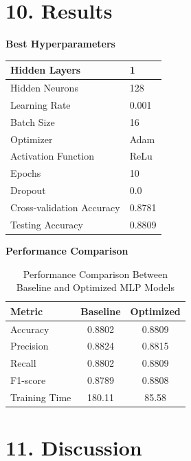 \documentclass[11pt]{article}
\begin{document}
\section*{10. Results}

\textbf{Best Hyperparameters}

\begin{tabular}{|p{6cm}|p{6cm}|}
\hline
Hidden Layers & 1\\\hline 
Hidden Neurons & 128\\\hline
Learning Rate & 0.001\\\hline
Batch Size & 16\\\hline
Optimizer & Adam\\\hline
Activation Function & ReLu\\\hline
Epochs & 10\\\hline
Dropout & 0.0\\\hline
Cross-validation Accuracy & 0.8781\\\hline
Testing Accuracy & 0.8809\\\hline
\end{tabular}

\vspace{3mm}

\textbf{Performance Comparison}

\begin{table}[H]
\centering
\begin{tabular}{|p{4cm}|c|c|}
\hline
\textbf{Metric} & \textbf{Baseline} & \textbf{Optimized} \\
\hline
Accuracy & 0.8802 & 0.8809 \\ \hline
Precision & 0.8824 & 0.8815 \\ \hline
Recall & 0.8802 & 0.8809 \\ \hline
F1-score & 0.8789 & 0.8808 \\ \hline
Training Time & 180.11 & 85.58 \\ \hline
\end{tabular}
\caption{Performance Comparison Between Baseline and Optimized MLP Models}
\end{table}

\section*{11. Discussion}
\end{document}
